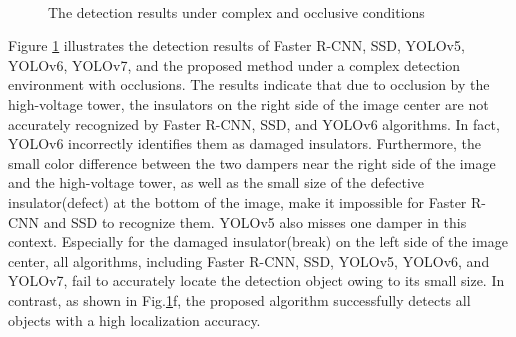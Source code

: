 \documentclass[sn-mathphys,Numbered]{sn-jnl}%
\theoremstyle{thmstyleone}%
\theoremstyle{thmstyletwo}%
\theoremstyle{thmstylethree}%
\begin{document}
\begin{figure}[htbp]
	\centering
 \\
	
	\centering
	\caption{The detection results under complex and occlusive conditions}\label{fig12}
\end{figure}

Figure \ref{fig12} illustrates the detection results of Faster R-CNN, SSD, YOLOv5, YOLOv6, YOLOv7, and the proposed method under a complex detection environment with occlusions. The results indicate that due to occlusion by the high-voltage tower, the insulators on the right side of the image center are not accurately recognized by Faster R-CNN, SSD, and YOLOv6 algorithms. In fact, YOLOv6 incorrectly identifies them as damaged insulators. Furthermore, the small color difference between the two dampers near the right side of the image and the high-voltage tower, as well as the small size of the defective insulator(defect) at the bottom of the image, make it impossible for Faster R-CNN and SSD to recognize them. YOLOv5 also misses one damper in this context. Especially for the damaged insulator(break) on the left side of the image center, all algorithms, including Faster R-CNN, SSD, YOLOv5, YOLOv6, and YOLOv7, fail to accurately locate the detection object owing to its small size. In contrast, as shown in Fig.\ref{fig12}f, the proposed algorithm successfully detects all objects with a high localization accuracy.
\end{document}

